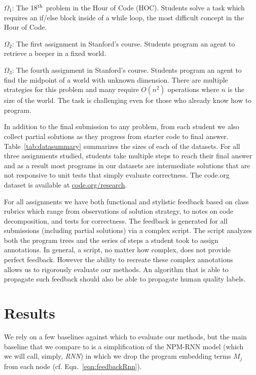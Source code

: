 $\Omega_1$: The 18$\textsuperscript{th}$ problem in the Hour of Code (HOC). Students solve a task which requires an if/else block inside of a while loop, the most difficult concept in the Hour of Code.

$\Omega_2$: The first assignment in Stanford's course. Students program an agent to retrieve a beeper in a fixed world.

$\Omega_3$: The fourth assignment in Stanford's course. Students program an agent to find the midpoint of a world with unknown dimension. There are multiple  strategies for this problem and many require $O(n^2)$ operations where $n$ is the size of the world. The task is challenging even for those who already know how to program.

In addition to the final submission to any problem, from each student we also collect partial solutions as they progress from starter code to  final answer.  Table~\ref{tab:datasummary} summarizes the sizes of each of the datasets. For all three assignments studied, students take multiple steps to reach their final answer and as a result most programs in our datasets are intermediate solutions that are not responsive to unit tests that simply evaluate correctness. The code.org dataset is available at \url{code.org/research}.

For all assignments we have both functional and stylistic feedback based on  class rubrics which range from observations of solution strategy, to notes on code decomposition, and tests for correctness. The feedback is generated for all submissions (including partial solutions) via a complex script. The script analyzes both the program trees and the series of steps a student took to assign annotations. In general, a script, no matter how complex, does not provide perfect feedback. However the ability to recreate these complex annotations allows us to rigorously evaluate our methods. An algorithm that is able to propagate such feedback should also be able to propagate human quality labels.

\section{Results}\label{sec:experiments}
We rely on a few baselines against which to evaluate our methods,
but the main baseline that we compare to is a simplification of
the NPM-RNN model (which we will call, simply, \emph{RNN}) in which we
drop the program embedding terms $M_j$ from each node 
(cf. Eqn.~\ref{eqn:feedbackRnn}).  

